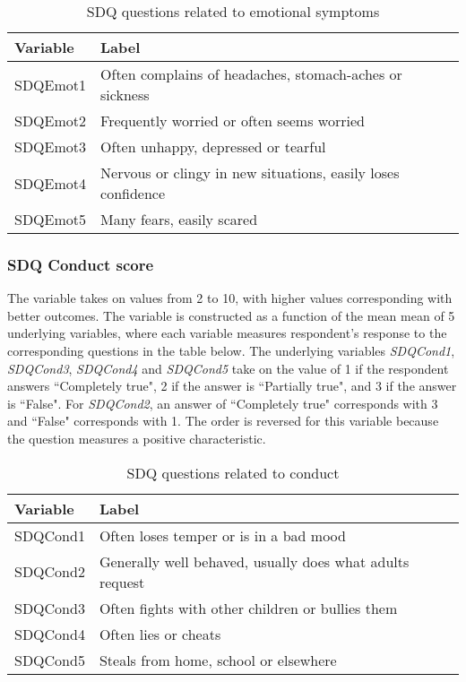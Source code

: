\begin{table}[H]
\begin{center}
\footnotesize{
\caption{SDQ questions related to emotional symptoms}
\begin{tabular}{l l}
\hline
\textbf{Variable} & \textbf{Label} \\
\hline
SDQEmot1 & Often complains of headaches, stomach-aches or sickness\\
SDQEmot2 & Frequently worried or often seems worried\\
SDQEmot3 & Often unhappy, depressed or tearful\\
SDQEmot4 & Nervous or clingy in new situations, easily loses confidence\\
SDQEmot5 & Many fears, easily scared\\
\hline
\end{tabular}
}
\end{center}
\end{table}

\subsubsection{SDQ Conduct score}
The variable takes on values from 2 to 10, with higher values corresponding with better outcomes. The variable is constructed as a function of the mean mean of 5 underlying variables, where each variable measures respondent's response to the corresponding questions in the table below. The underlying variables \textit{SDQCond1}, \textit{SDQCond3}, \textit{SDQCond4} and \textit{SDQCond5} take on the value of 1 if the respondent answers  ``Completely true", 2 if the answer is ``Partially true", and 3 if the answer is ``False". For \textit{SDQCond2}, an answer of ``Completely true" corresponds with 3 and ``False" corresponds with 1. The order is reversed for this variable because the question measures a positive characteristic. \\

\begin{table}[H]
\begin{center}
\footnotesize{
\caption{SDQ questions related to conduct}
\begin{tabular}{l l}
\hline
\textbf{Variable} & \textbf{Label} \\
\hline
SDQCond1 & Often loses temper or is in a bad mood\\
SDQCond2 &  Generally well behaved, usually does what adults request \\
SDQCond3 & Often fights with other children or bullies them\\
SDQCond4 & Often lies or cheats\\
SDQCond5 & Steals from home, school or elsewhere\\
\hline
\end{tabular}
}
\end{center}
\end{table}

